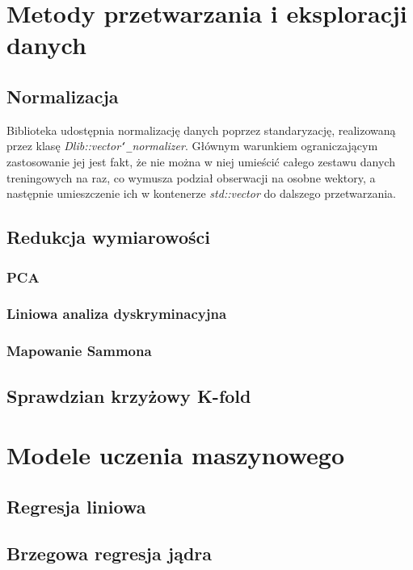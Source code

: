 \section{Metody przetwarzania i eksploracji danych}

\subsection{Normalizacja}
Biblioteka udostępnia normalizację danych poprzez standaryzację, realizowaną przez klasę \textit{Dlib::vector\texttt{\char`_}normalizer}. Głównym warunkiem ograniczającym zastosowanie jej jest fakt, że nie można w niej umieścić całego zestawu danych treningowych na raz, co wymusza podział obserwacji na osobne wektory, a następnie umieszczenie ich w kontenerze \textit{std::vector} do dalszego przetwarzania.

\subsection{Redukcja wymiarowości}

\subsubsection{PCA}
\subsubsection{Liniowa analiza dyskryminacyjna}
\subsubsection{Mapowanie Sammona}

\subsection{Sprawdzian krzyżowy K-fold}


\section{Modele uczenia maszynowego}

\subsection{Regresja liniowa}
\subsection{Brzegowa regresja jądra}
